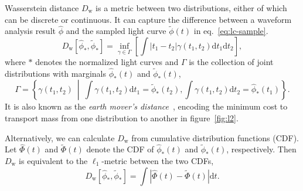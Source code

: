 Wasserstein distance $D_\mathrm{w}$ is a metric between two distributions, either of which can be discrete or continuous. It can capture the difference between a waveform analysis result $\hat{\phi}$ and the sampled light curve $\tilde{\phi}(t)$ in eq.~\eqref{eq:lc-sample}.
\begin{equation}
  D_\mathrm{w}\left[\hat{\phi}_*, \tilde{\phi}_*\right] = \inf_{\gamma \in \Gamma} \left[\int \left\vert t_1 - t_2 \right\vert \gamma(t_1, t_2)\mathrm{d}t_1\mathrm{d}t_2\right],
\end{equation}
where $*$ denotes the normalized light curves and $\Gamma$ is the collection of joint distributions with marginals $\hat{\phi}_*(t)$ and $\tilde{\phi}_*(t)$,
\begin{equation*}
  \label{eq:joint}
  \Gamma = \left\{\gamma(t_1, t_2) ~\middle\vert~ \int\gamma(t_1,t_2)\mathrm{d}t_1 = \tilde{\phi}_*(t_2) , \int\gamma(t_1,t_2)\mathrm{d}t_2 = \hat{\phi}_*(t_1) \right\}.
\end{equation*}
It is also known as the \textit{earth mover's distance}~\cite{levina_earth_2001}, encoding the minimum cost to transport mass from one distribution to another in figure~\ref{fig:l2}.

Alternatively, we can calculate $D_\mathrm{w}$ from cumulative distribution functions (CDF). Let $\hat\Phi(t)$ and $\tilde\Phi(t)$ denote the CDF of $\hat{\phi}_*(t)$ and $\tilde{\phi}_*(t)$, respectively. Then $D_\mathrm{w}$ is equivalent to the $\ell_1$-metric between the two CDFs,
\begin{equation}
    D_\mathrm{w}\left[\hat{\phi}_*, \tilde{\phi}_*\right] = \int\left|\hat{\Phi}(t) - \tilde{\Phi}(t)\right| \mathrm{d}t.
    \label{eq:numerical}
\end{equation}
